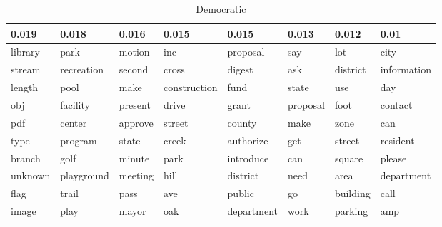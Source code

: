 \begin{table}[ht]
\centering
\begingroup\tiny
\begin{tabular}{llllllll}
  \hline
0.019 & 0.018 & 0.016 & 0.015 & 0.015 & 0.013 & 0.012 & 0.01 \\ 
  \hline
library & park & motion & inc & proposal & say & lot & city \\ 
  stream & recreation & second & cross & digest & ask & district & information \\ 
  length & pool & make & construction & fund & state & use & day \\ 
  obj & facility & present & drive & grant & proposal & foot & contact \\ 
  pdf & center & approve & street & county & make & zone & can \\ 
  type & program & state & creek & authorize & get & street & resident \\ 
  branch & golf & minute & park & introduce & can & square & please \\ 
  unknown & playground & meeting & hill & district & need & area & department \\ 
  flag & trail & pass & ave & public & go & building & call \\ 
  image & play & mayor & oak & department & work & parking & amp \\ 
   \hline
\end{tabular}
\endgroup
\caption{Democratic} 
\label{tabSTMIN_LARep}
\end{table}

